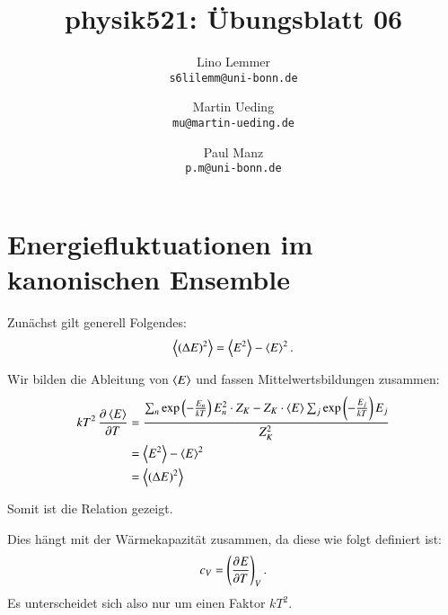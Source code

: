 

\setcounter{section}{0}
\renewcommand\thesection{H\,6.\arabic{section}}
\renewcommand\thesubsection{\thesection.\alph{subsection}}

\title{physik521: Übungsblatt 06}
\author{%
    Lino Lemmer \\ \small{\texttt{s6lilemm@uni-bonn.de}}
    \and
    Martin Ueding \\ \small{\texttt{mu@martin-ueding.de}}
    \and
    Paul Manz \\ \small{\texttt{p.m@uni-bonn.de}}
}


\maketitle

\section{Energiefluktuationen im kanonischen Ensemble}

Zunächst gilt generell Folgendes:
\[
    \left\langle(\Delta E)^2\right\rangle = \left\langle E^2\right\rangle - \left\langle E\right\rangle^2.
\]

Wir bilden die Ableitung von $\left\langle E\right\rangle$ und fassen Mittelwertsbildungen zusammen:
\begin{align*}
    kT^2 \dpd{\mw E}T
    &= \frac{\sum_n \exp\del{-\frac{E_n}{kT}} E_n^2 \cdot Z_K - Z_K \cdot \mw E \sum_j \exp\del{-\frac{E_j}{kT}} E_j}{Z_K^2} \\
    &= \mw{E^2} - \mw{E}^2 \\
    &= \mw{(\Delta E)^2}
\end{align*}

Somit ist die Relation gezeigt.

Dies hängt mit der Wärmekapazität zusammen, da diese wie folgt definiert ist:
\[
    c_V = \tdpd ETV.
\]
Es unterscheidet sich also nur um einen Faktor $kT^2$.


